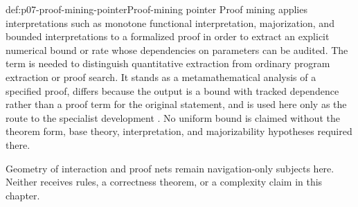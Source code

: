 \begin{proofboundary}{def:p07-proof-mining-pointer}{Proof-mining pointer}
Proof mining applies interpretations such as monotone functional
interpretation, majorization, and bounded interpretations to a formalized proof
in order to extract an explicit numerical bound or rate whose dependencies on
parameters can be audited. The term is needed to distinguish quantitative
extraction from ordinary program extraction or proof search. It stands as a
metamathematical analysis of a specified proof, differs because the output is
a bound with tracked dependence rather than a proof term for the original
statement, and is used here only as the route to the specialist development
\cite{Kohlenbach2008}. No uniform bound is claimed without the theorem form,
base theory, interpretation, and majorizability hypotheses required there.
\end{proofboundary}

Geometry of interaction and proof nets remain navigation-only subjects here.
Neither receives rules, a correctness theorem, or a complexity claim in this
chapter.
